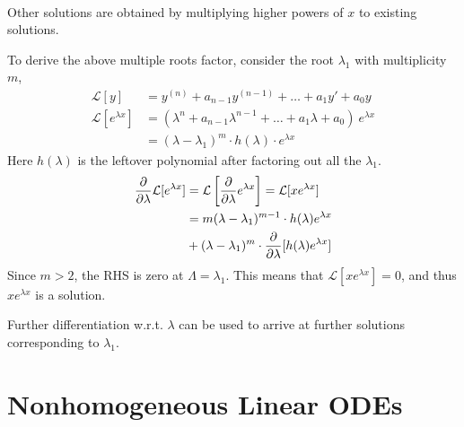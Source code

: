 \begin{description}
\begin{align}
        \end{align}
        Other solutions are obtained by multiplying higher powers of $ x $ to existing solutions.
        \par
        To derive the above multiple roots factor, consider the root $ \lambda_{1} $ with
        multiplicity $ m $,
        \begin{align}
            \mathcal{L}[y]             & = y^{(n)} + a_{n-1}y^{(n-1)} + \dots + a_{1}y' + a_{0}y                              \\
            \mathcal{L}[e^{\lambda x}] & = (\lambda^{n} + a_{n-1}\lambda^{n-1} + \dots + a_{1}\lambda + a_{0})\ e^{\lambda x} \\
                                       & = (\lambda - \lambda_{1})^{m} \cdot h(\lambda) \cdot e^{\lambda x}
        \end{align}
        Here $ h(\lambda) $ is the leftover polynomial after factoring out all the $ \lambda_{1} $.
        \begin{align}
            \diffp**{\lambda}{\mathcal{L}[e^{\lambda x}]}
             & = \mathcal{L}\left[ \diffp**{\lambda}{e^{\lambda x}} \right]
            = \mathcal{L}[xe^{\lambda x}]                                                       \\
             & = m(\lambda - \lambda_{1})^{m-1} \cdot h(\lambda)e^{\lambda x} \nonumber         \\
             & + (\lambda - \lambda_{1})^{m} \cdot \diffp**{\lambda}{[h(\lambda)e^{\lambda x}]} \\
        \end{align}
        Since $ m > 2 $, the RHS is zero at $ \Lambda = \lambda_{1} $. This means that
        $\mathcal{L}[xe^{\lambda x}] = 0$, and thus $ xe^{\lambda x} $ is a solution.
        \par Further differentiation w.r.t. $ \lambda $ can be used to arrive at further
        solutions corresponding to $ \lambda_{1} $.
\end{description}

\section{Nonhomogeneous Linear ODEs}

